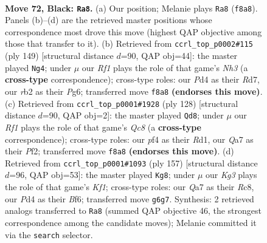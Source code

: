 \documentclass[11pt]{article}
\begin{document}
\clearpage

\begin{figure}[p]\centering
\begin{subfigure}{0.46\textwidth}\centering
\resizebox{\linewidth}{!}{%
\newchessgame
\chessboard[
  setfen={5r2/q3b3/5nk1/P1p2p2/3p1Pp1/8/QR1BPK2/3N4 b - - 5 72},
  showmover=false,
  pgfstyle=straightmove, color=movearrow, markmove={f8-a8}
]}
\caption{}
\end{subfigure}\hfill
\begin{subfigure}{0.46\textwidth}\centering
\resizebox{\linewidth}{!}{%
\newchessgame
\chessboard[
  setfen={1q6/3r3k/3p2pn/2pP3p/2P1N2P/1PQ5/1R6/1K6 b - - 0 75},
  showmover=false,
  pgfstyle=straightmove, color=movearrow, markmove={h6-g4}
]}
\caption{}
\end{subfigure}
\\[4pt]
\begin{subfigure}{0.46\textwidth}\centering
\resizebox{\linewidth}{!}{%
\newchessgame
\chessboard[
  setfen={2Q5/p1r2qk1/P5p1/4p3/1b2P2p/5B1P/5PP1/3R2K1 w - - 1 65},
  showmover=false,
  pgfstyle=straightmove, color=movearrow, markmove={c8-d8}
]}
\caption{}
\end{subfigure}\hfill
\begin{subfigure}{0.46\textwidth}\centering
\resizebox{\linewidth}{!}{%
\newchessgame
\chessboard[
  setfen={2r2k2/3q1pp1/5b1p/1p3P1P/1P6/P3R1PK/2B3Q1/8 b - - 52 79},
  showmover=false,
  pgfstyle=straightmove, color=movearrow, markmove={f8-g8}
]}
\caption{}
\end{subfigure}
\caption{\textbf{Move 72, Black: \texttt{Ra8}.} (a) Our position; Melanie plays \texttt{Ra8} (\texttt{f8a8}). Panels (b)--(d) are the retrieved master positions whose correspondence most drove this move (highest QAP objective among those that transfer to it). (b) Retrieved from \texttt{ccrl\_top\_p0002\#115} (ply 149) [structural distance $d$=90, QAP obj=44]: the master played \texttt{Ng4}; under $\mu$ our \emph{Rf1} plays the role of that game's \emph{Nh3} (a \textbf{cross-type} correspondence); cross-type roles: our \emph{P}d4 as their \emph{R}d7, our \emph{r}b2 as their \emph{P}g6; transferred move \texttt{f8a8} \textbf{(endorses this move)}. (c) Retrieved from \texttt{ccrl\_top\_p0001\#1928} (ply 128) [structural distance $d$=90, QAP obj=2]: the master played \texttt{Qd8}; under $\mu$ our \emph{Rf1} plays the role of that game's \emph{Qc8} (a \textbf{cross-type} correspondence); cross-type roles: our \emph{p}f4 as their \emph{R}d1, our \emph{Q}a7 as their \emph{P}f2; transferred move \texttt{f8a8} \textbf{(endorses this move)}. (d) Retrieved from \texttt{ccrl\_top\_p0001\#1093} (ply 157) [structural distance $d$=96, QAP obj=53]: the master played \texttt{Kg8}; under $\mu$ our \emph{Kg3} plays the role of that game's \emph{Kf1}; cross-type roles: our \emph{Q}a7 as their \emph{R}c8, our \emph{P}d4 as their \emph{B}f6; transferred move \texttt{g6g7}. Synthesis: 2 retrieved analogs transferred to \texttt{Ra8} (summed QAP objective 46, the strongest correspondence among the candidate moves); Melanie committed it via the \texttt{search} selector.}
\label{fig:thought-m143}
\end{figure}
\end{document}
